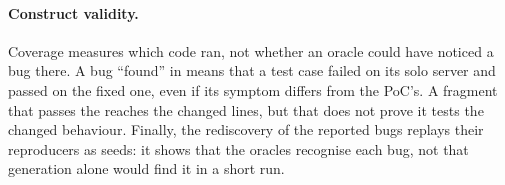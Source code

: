 \paragraph{Construct validity.} Coverage measures which code ran, not whether
an oracle could have noticed a bug there. A bug ``found'' in  means
that a test case failed on its solo server and passed on the fixed one, even if
its symptom differs from the PoC's. A fragment that passes the \gate reaches the
changed lines, but that does not prove it tests the changed behaviour. Finally,
the rediscovery of the reported bugs replays their reproducers as seeds: it
shows that the oracles recognise each bug, not that generation alone would find
it in a short run.
